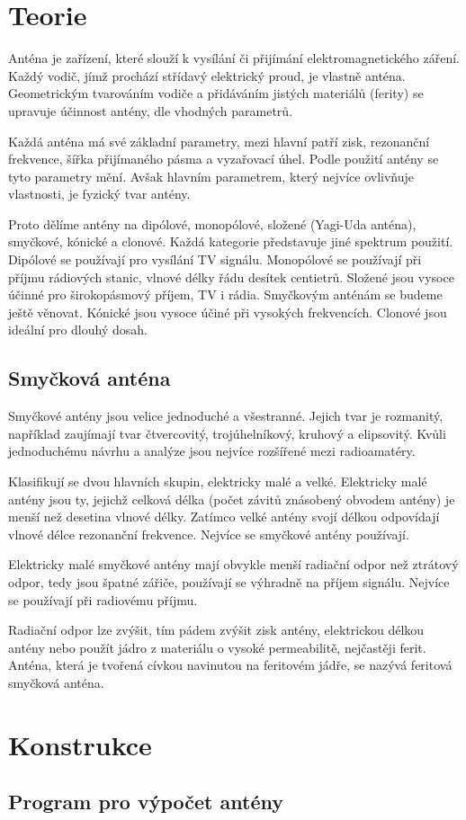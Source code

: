 \section{Teorie}

Anténa je zařízení, které slouží k vysílání či přijímání elektromagnetického záření.
Každý vodič, jímž prochází střídavý elektrický proud, je vlastně anténa. Geometrickým
tvarováním vodiče a přidáváním jistých materiálů (ferity) se upravuje účinnost antény, dle
vhodných parametrů.

Každá anténa má své základní parametry, mezi hlavní patří zisk, rezonanční frekvence,
šířka přijímaného pásma a vyzařovací úhel. Podle použití antény se tyto parametry mění.
Avšak hlavním parametrem, který nejvíce ovlivňuje vlastnosti, je fyzický tvar antény.

Proto dělíme antény na dipólové, monopólové, složené (Yagi-Uda anténa), smyčkové, kónické
a clonové. Každá kategorie představuje jiné spektrum použití. Dipólové
se používají pro vysílání TV signálu. Monopólové se používají při
příjmu rádiových stanic, vlnové délky řádu desítek centietrů. Složené jsou vysoce účinné
pro širokopásmový příjem, TV i rádia. Smyčkovým anténám se budeme ještě věnovat. Kónické
jsou vysoce účiné při vysokých frekvencích. Clonové jsou ideální pro dlouhý dosah.

\subsection{Smyčková anténa}

Smyčkové antény jsou velice jednoduché a všestranné. Jejich tvar je rozmanitý, například
zaujímají tvar čtvercovitý, trojúhelníkový, kruhový a elipsovitý. Kvůli jednoduchému
návrhu a analýze jsou nejvíce rozšířené mezi radioamatéry.

Klasifikují se dvou hlavních skupin, elektricky malé a velké. Elektricky malé antény jsou
ty, jejichž celková délka (počet závitů znásobený obvodem antény) je menší než desetina
vlnové délky. Zatímco velké antény svojí délkou odpovídají vlnové délce rezonanční
frekvence. Nejvíce se smyčkové antény používají.

Elektricky malé smyčkové antény mají obvykle menší radiační odpor než ztrátový odpor, tedy
jsou špatné zářiče, používají se výhradně na příjem signálu. Nejvíce se používají při
radiovému příjmu.

Radiační odpor lze zvýšit, tím pádem zvýšit zisk antény, elektrickou délkou antény nebo
použít jádro z materiálu o vysoké permeabilitě, nejčastěji ferit. Anténa, která je tvořená
cívkou navinutou na feritovém jádře, se nazývá feritová smyčková anténa.

\newpage

\section{Konstrukce}



\subsection{Program pro výpočet antény}

